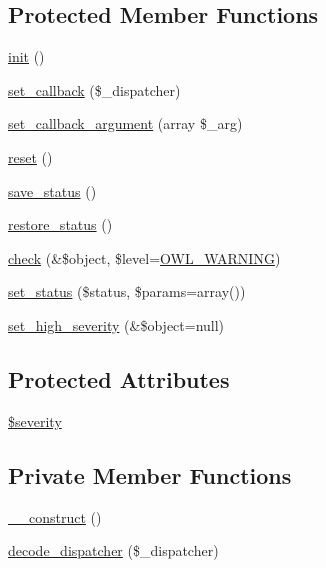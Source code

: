 \subsection*{Protected Member Functions}
\begin{DoxyCompactItemize}
\item 
\hyperlink{class__OWL_ae0ef3ded56e8a6b34b6461e5a721cd3e}{init} ()
\item 
\hyperlink{class__OWL_a28d9025eaf37b49d63cb334ed28c33f0}{set\_\-callback} (\$\_\-dispatcher)
\item 
\hyperlink{class__OWL_a1e26611ce858b237f5a98a91ea3c3a1b}{set\_\-callback\_\-argument} (array \$\_\-arg)
\item 
\hyperlink{class__OWL_a2f2a042bcf31965194c03033df0edc9b}{reset} ()
\item 
\hyperlink{class__OWL_a9e49b9c76fbc021b244c6915ea536d71}{save\_\-status} ()
\item 
\hyperlink{class__OWL_a465eeaf40edd9f9c848841700c32ce55}{restore\_\-status} ()
\item 
\hyperlink{class__OWL_ae2e3c56e5f3c4ce4156c6b1bb1c50f63}{check} (\&\$object, \$level=\hyperlink{owl_8severitycodes_8php_ace886152e2e86cd2e91cb833fd495adb}{OWL\_\-WARNING})
\item 
\hyperlink{class__OWL_aea912d0ede9b3c2a69b79072d94d4787}{set\_\-status} (\$status, \$params=array())
\item 
\hyperlink{class__OWL_a576829692a3b66e3d518853bf43abae3}{set\_\-high\_\-severity} (\&\$object=null)
\end{DoxyCompactItemize}
\subsection*{Protected Attributes}
\begin{DoxyCompactItemize}
\item 
\hyperlink{class__OWL_ad26b40a9dbbacb33e299b17826f8327c}{\$severity}
\end{DoxyCompactItemize}
\subsection*{Private Member Functions}
\begin{DoxyCompactItemize}
\item 
\hyperlink{classDispatcher_a62ba56a9c99d2b25616023812d965c32}{\_\-\_\-construct} ()
\item 
\hyperlink{classDispatcher_a8d39feb182fd4491de589e8b0edc1d25}{decode\_\-dispatcher} (\$\_\-dispatcher)
\end{DoxyCompactItemize}
